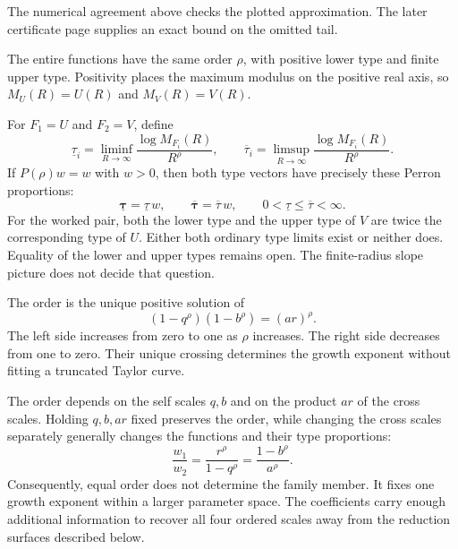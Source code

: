 The numerical agreement above checks the plotted approximation. The later
certificate page supplies an exact bound on the omitted tail.

The entire functions have the same order $\rho$, with positive lower type
and finite upper type. Positivity places the maximum modulus on the positive
real axis, so $M_U(R)=U(R)$ and $M_V(R)=V(R)$.


For $F_1=U$ and $F_2=V$, define
\[
\underline\tau_i=\liminf_{R\to\infty}\frac{\log M_{F_i}(R)}{R^\rho},
\qquad
\overline\tau_i=\limsup_{R\to\infty}\frac{\log M_{F_i}(R)}{R^\rho}.
\]
If $P(\rho)w=w$ with $w>0$, then both type vectors have precisely these
Perron proportions:
\[
\boxed{\underline{\boldsymbol\tau}=\underline\tau\,w,
\qquad\overline{\boldsymbol\tau}=\overline\tau\,w,
\qquad0<\underline\tau\le\overline\tau<\infty.}
\]
For the worked pair, both the lower type and the upper type of $V$ are
twice the corresponding type of $U$. Either both ordinary type limits
exist or neither does. Equality of the lower and upper types remains open.
The finite-radius slope picture does not decide that question.

The order is the unique positive solution of
\[
\boxed{(1-q^\rho)(1-b^\rho)=(ar)^\rho.}
\]
The left side increases from zero to one as $\rho$ increases. The right
side decreases from one to zero. Their unique crossing determines the
growth exponent without fitting a truncated Taylor curve.


The order depends on the self scales $q,b$ and on the product $ar$ of
the cross scales. Holding $q,b,ar$ fixed preserves the order, while
changing the cross scales separately generally changes the functions and
their type proportions:
\[
\frac{w_1}{w_2}=\frac{r^\rho}{1-q^\rho}
=\frac{1-b^\rho}{a^\rho}.
\]
Consequently, equal order does not determine the family member. It fixes
one growth exponent within a larger parameter space. The coefficients
carry enough additional information to recover all four ordered scales
away from the reduction surfaces described below.

